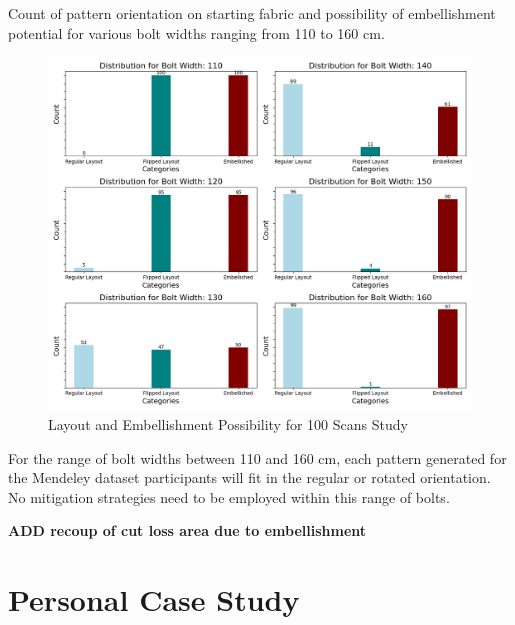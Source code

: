 Count of pattern orientation on starting fabric and possibility of embellishment potential for various bolt widths ranging from 110 to 160 cm.
\begin{figure} [H] %
    \centering %
    \includegraphics[width = \textwidth]{Images/Mendeley_Bar.png} %
    \caption{Layout and Embellishment Possibility for 100 Scans Study}
\end{figure}
For the range of bolt widths between 110 and 160 cm, each pattern generated for the Mendeley dataset participants will fit in the regular or rotated orientation. No mitigation strategies need to be employed within this range of bolts.

\textbf{ADD recoup of cut loss area due to embellishment}

\section{Personal Case Study}
